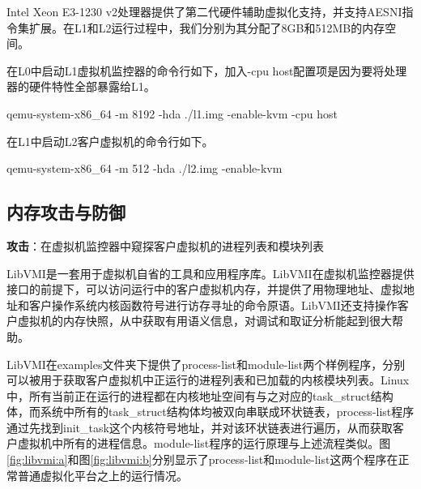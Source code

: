Intel Xeon E3-1230 v2处理器提供了第二代硬件辅助虚拟化支持，并支持AESNI指令集扩展。在L1和L2运行过程中，我们分别为其分配了8GB和512MB的内存空间。

在L0中启动L1虚拟机监控器的命令行如下，加入-cpu host配置项是因为要将处理器的硬件特性全部暴露给L1。

qemu-system-x86\_64 -m 8192 -hda ./l1.img -enable-kvm -cpu host

在L1中启动L2客户虚拟机的命令行如下。

qemu-system-x86\_64 -m 512 -hda ./l2.img -enable-kvm

\subsection{内存攻击与防御}

\noindent
\textbf{攻击\uppercase\expandafter{}}：在虚拟机监控器中窥探客户虚拟机的进程列表和模块列表

LibVMI是一套用于虚拟机自省的工具和应用程序库。LibVMI在虚拟机监控器提供接口的前提下，可以访问运行中的客户虚拟机内存，并提供了用物理地址、虚拟地址和客户操作系统内核函数符号进行访存寻址的命令原语。LibVMI还支持操作客户虚拟机的内存快照，从中获取有用语义信息，对调试和取证分析能起到很大帮助。

LibVMI在examples文件夹下提供了process-list和module-list两个样例程序，分别可以被用于获取客户虚拟机中正运行的进程列表和已加载的内核模块列表。Linux中，所有当前正在运行的进程都在内核地址空间有与之对应的task\_struct结构体，而系统中所有的task\_struct结构体均被双向串联成环状链表，process-list程序通过先找到init\_task这个内核符号地址，并对该环状链表进行遍历，从而获取客户虚拟机中所有的进程信息。module-list程序的运行原理与上述流程类似。图\ref{fig:libvmi:a}和图\ref{fig:libvmi:b}分别显示了process-list和module-list这两个程序在正常普通虚拟化平台之上的运行情况。

\begin{figure}
\centering
{}
\end{figure}


